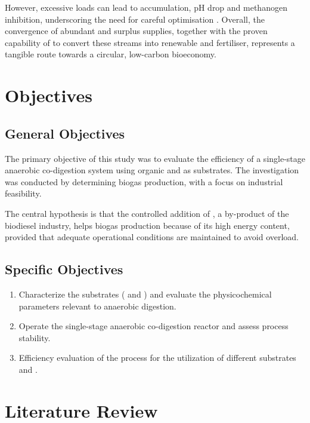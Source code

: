\documentclass[12pt, a4paper, oneside]{report}
\begin{document}
However, excessive  loads can lead to  accumulation, pH drop and methanogen inhibition, underscoring the need for careful optimisation \parencite{gebreegziabher2025, tomczak2025}. Overall, the convergence of abundant  and surplus  supplies, together with the proven capability of  to convert these streams into renewable  and fertiliser, represents a tangible route towards a circular, low-carbon bioeconomy.

\chapter{Objectives}
\label{ch:objectives}

\section{General Objectives}
\label{sec:general_objectives}

The primary objective of this study was to evaluate the efficiency of a single-stage anaerobic co-digestion system using organic  and  as substrates. The investigation was conducted by determining biogas production, with a focus on industrial feasibility.

The central hypothesis is that the controlled addition of , a by-product of the biodiesel industry, helps biogas production because of its high energy content, provided that adequate operational conditions are maintained to avoid  overload.

\section{Specific Objectives}
\label{sec:specific_objectives}

\begin{enumerate}
    \item Characterize the substrates ( and ) and evaluate the physicochemical parameters relevant to anaerobic digestion.
    \item Operate the single-stage anaerobic co-digestion reactor and assess process stability.
    \item Efficiency evaluation of the process for the utilization of different substrates and .
\end{enumerate}

\clearpage{}
\clearpage{}\chapter{Literature Review}
\label{ch:literature_review}
\end{document}
